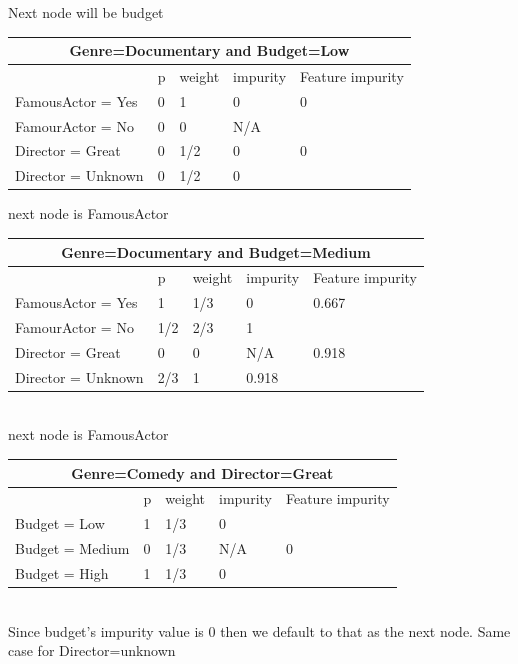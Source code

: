 \documentclass[letter]{article}
\theoremstyle{case}
\begin{document}
Next node will be budget \\
\newpage
\begin{table}[!h]
\begin{tabular}{|l|l|l|l|l|}
\hline
\multicolumn{5}{|c|}{Genre=Documentary and Budget=Low}             \\ \hline
                   & p & weight & impurity & Feature impurity \\ \hline
FamousActor = Yes  & 0 & 1      & 0        & 0                \\ \cline{1-4}
FamourActor = No   & 0 & 0      & N/A        &                  \\ \hline
Director = Great   & 0 & 1/2    & 0        & 0                \\ \cline{1-4}
Director = Unknown & 0 & 1/2    & 0        &                  \\ \hline
\end{tabular}
\end{table}
next node is FamousActor \\
\begin{table}[!h]
\begin{tabular}{|l|l|l|l|l|}
\hline
\multicolumn{5}{|c|}{Genre=Documentary and Budget=Medium}               \\ \hline
                   & p   & weight & impurity & Feature impurity \\ \hline
FamousActor = Yes  & 1   & 1/3    & 0        & 0.667            \\ \cline{1-4}
FamourActor = No   & 1/2 & 2/3    & 1        &                  \\ \hline
Director = Great   & 0   & 0      & N/A      & 0.918            \\ \cline{1-4}
Director = Unknown & 2/3 & 1      & 0.918    &                  \\ \hline
\end{tabular}
\end{table} \\
next node is FamousActor \\
\begin{table}[!h]
\begin{tabular}{|l|l|l|l|l|}
\hline
\multicolumn{5}{|c|}{Genre=Comedy and Director=Great}          \\ \hline
                & p & weight & impurity & Feature impurity \\ \hline
Budget = Low    & 1 & 1/3    & 0        &                  \\ \cline{1-4}
Budget = Medium & 0 & 1/3    & N/A      & 0                \\ \cline{1-4}
Budget = High   & 1 & 1/3    & 0        &                  \\ \hline
\end{tabular}
\end{table} \\
Since budget's impurity value is 0 then we default to that as the next node. Same case for Director=unknown \\
\end{document}
